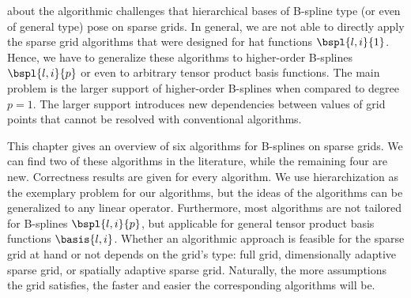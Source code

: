 
\label{chap:40algorithms}


about the algorithmic challenges
that hierarchical bases of B-spline type (or even of general type) pose
on sparse grids.
In general, we are not able to directly apply the sparse grid algorithms
that were designed for hat functions $\bspl{l,i}{1}$.
Hence, we have to generalize these algorithms
to higher-order B-splines $\bspl{l,i}{p}$
or even to arbitrary tensor product basis functions.
The main problem is the larger support
of higher-order B-splines when compared to degree $p = 1$.
The larger support introduces new dependencies between
values of grid points that cannot be resolved with conventional algorithms.

This chapter gives an overview of six algorithms for B-splines
on sparse grids.
We can find two of these algorithms in the literature,
while the remaining four are new.
Correctness results are given for every algorithm.
We use hierarchization as the exemplary problem for our algorithms,
but the ideas of the algorithms can be generalized to any linear operator.
Furthermore, most algorithms are not tailored for B-splines $\bspl{l,i}{p}$,
but applicable for general tensor product basis functions $\basis{l,i}$.
Whether an algorithmic approach is feasible for the sparse grid at hand
or not depends on the grid's type:
full grid, dimensionally adaptive sparse grid, or
spatially adaptive sparse grid.
Naturally, the more assumptions the grid satisfies, the faster and
easier the corresponding algorithms will be.

